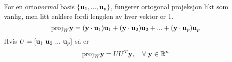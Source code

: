 For en orto\emph{normal} basis $\{ \mathbf{u}_1, ..., \mathbf{u}_p \}$,
fungerer ortogonal projeksjon likt som vanlig, men litt enklere fordi
lengden av hver vektor er 1.
$$\text{proj}_W\mathbf{y}
  = (\mathbf{y}\cdot\mathbf{u}_1)\mathbf{u}_1
    + (\mathbf{y}\cdot\mathbf{u}_2)\mathbf{u}_2
    + ...
    + (\mathbf{y}\cdot\mathbf{u}_p)\mathbf{u}_p$$
Hvis $U = [\mathbf{u}_1\ \mathbf{u}_2\ ...\ \mathbf{u}_p]$ så er
$$\text{proj}_W\mathbf{y} = UU^T\mathbf{y}, \quad \forall\ \mathbf{y}\in\mathbb{R}^n$$
